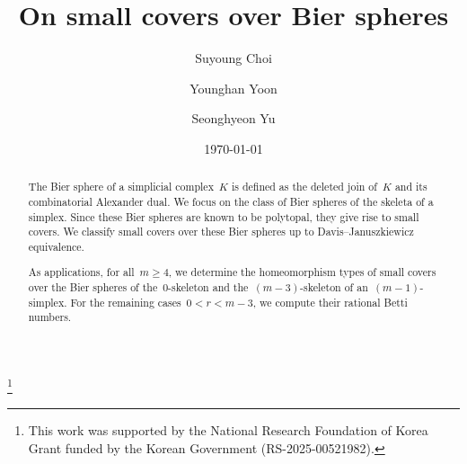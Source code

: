 \documentclass[11pt]{amsart}
\theoremstyle{plain}
\numberwithin{equation}{section}
\theoremstyle{definition}
\begin{document}
\title[On small covers over Bier spheres]{On small covers over Bier spheres}

\author[S. Choi]{Suyoung Choi}
\address{Department of mathematics, Ajou University, 206, World cup-ro, Yeongtong-gu, Suwon 16499,  Republic of Korea}

\author[Y. Yoon]{Younghan Yoon}
\address{Research Institute of Basic Sciences, Ajou University, 206, World cup-ro, Yeongtong-gu, Suwon 16499, Republic of Korea}

\author[S. Yu]{Seonghyeon Yu}
\address{Department of mathematics, Ajou University, 206, World cup-ro, Yeongtong-gu, Suwon 16499,  Republic of Korea}

\date{\today}


\thanks{This work was supported by the National Research Foundation of Korea Grant funded by the Korean Government (RS-2025-00521982).}

\begin{abstract}
    The Bier sphere of a simplicial complex~$K$ is defined as the deleted join of~$K$ and its combinatorial Alexander dual.
    We focus on the class of Bier spheres of the skeleta of a simplex.
    Since these Bier spheres are known to be polytopal, they give rise to small covers.
    We classify small covers over these Bier spheres up to Davis--Januszkiewicz equivalence.
     
    As applications, for all~$m \geq 4$, we determine the homeomorphism types of small covers over the Bier spheres of the~$0$-skeleton and the~$(m-3)$-skeleton of an~$(m-1)$-simplex.
    For the remaining cases~$0<r<m-3$, we compute their rational Betti numbers.
\end{abstract}
\maketitle
\end{document}

